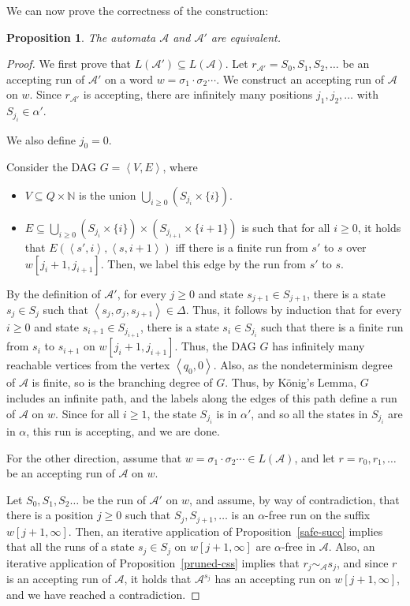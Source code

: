\documentclass[10pt,a4paper]{amsart}
\newtheorem{prop}[thm]{Proposition}
\theoremstyle{definition}
\numberwithin{equation}{section}
\newcommand{\A}{{\mathcal A}}
\newcommand{\zug}[1]{\left\langle #1 \right\rangle}
\begin{document}
We can now prove the correctness of the construction:

\begin{prop}\label{A and A_D are equiv}
	The automata $\A$ and $\A'$ are equivalent.
\end{prop}

\begin{proof}
We first prove that $L(\A') \subseteq L(\A)$. Let $r_{\A'}=S_0, S_1, S_2, \ldots $ be an accepting run of $\A'$ on a  word $w = \sigma_1 \cdot \sigma_2 \cdots$. We construct an accepting run of $\A$ on $w$. Since $r_{\A'}$ is accepting, there are infinitely many positions $j_1,j_2,\ldots$ with $S_{j_i} \in \alpha'$. 

We also define $j_0 = 0$.

\noindent %
	Consider the DAG $G= \zug{V, E}$, where 
	\begin{itemize}
		\item 	 $V\subseteq Q\times \mathbb{N}$ is the union $\bigcup_{i\geq 0}(S_{j_i} \times \{i\})$.
		
		\item $E\subseteq \bigcup_{i\geq 0} (S_{j_i} \times \{i\}) \times (S_{j_{i+1}} \times \{i+1\})$ is such that for all $i\geq 0$, it holds that $E(\zug{s', i}, \zug{s, i+1})$ iff there is a finite run from $s'$ to $s$ over $w[j_i + 1, j_{i+1} ] $. Then, we label this edge by the run from $s'$ to $s$. 
	\end{itemize}
	By the definition of $\A'$, for every $j \geq 0$ and state $s_{j+1}\in S_{j+1}$, there is a state $s_j\in S_j$ such that $\zug{s_j, \sigma_j, s_{j+1}} \in \Delta$. Thus, it follows by induction that for every $i \geq 0$ and state $s_{i+1}  \in S_{j_{i+1}}$, there is a state $s_i \in S_{j_i}$ such that there is a finite run from $s_i$ to $s_{i+1}$ on $w[j_i + 1, j_{i+1} ] $. Thus, the DAG $G$ has infinitely many reachable vertices from the vertex $\zug{q_0, 0}$. Also, as the nondeterminism degree of $\A$ is finite, so is the branching degree of $G$. Thus, by K\"onig's Lemma, $G$ includes an infinite path, and the labels along the edges of this path define a run of $\A$ on $w$. Since for all $i \geq 1$, the state $S_{j_i}$  is in $\alpha'$, and so all the states in $S_{j_i}$ are in $\alpha$, this run is accepting, and we are done. 

	
	For the other direction, assume that $w = \sigma_1 \cdot \sigma_2 \cdots \in L(\A)$, and let $r=r_0, r_1, \ldots $ be an accepting run of $\A$ on $w$.
	
	Let $S_0, S_1, S_2 \ldots $ be the run of $\A'$ on $w$, and assume, by way of contradiction, that there is a position $j\geq 0$ such that $S_j, S_{j+1}, \ldots $ is an $\alpha$-free run on the suffix $w[j+1, \infty]$. Then, an iterative application of Proposition~\ref{safe-succ} implies that all the runs of a state $s_j \in S_j$ on  $w[j+1, \infty]$ are $\alpha$-free in $\A$. Also, an iterative application of Proposition~\ref{pruned-css} implies that $r_j \sim_\A s_j$, and since $r$ is an accepting run of $\A$, it holds that $\A^{s_j}$ has an accepting run on $w[j+1, \infty]$, and we have reached a contradiction.
	
\end{proof}
\end{document}
